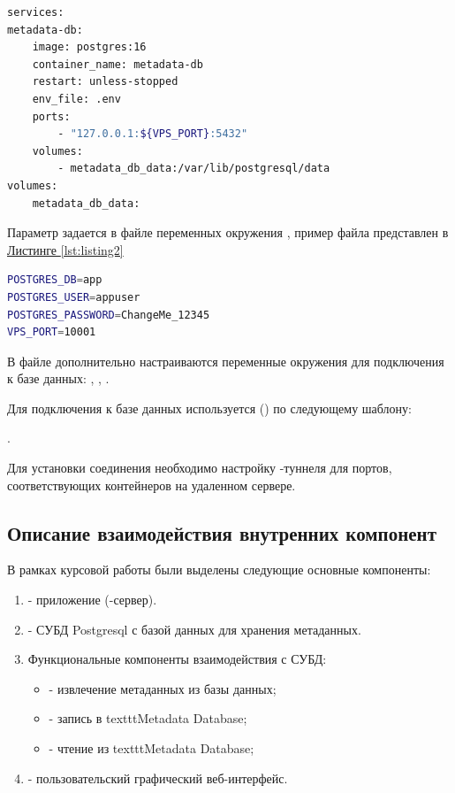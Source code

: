 \lstset{basicstyle=\ttfamily\small}
\begin{lstlisting}[language=bash, caption={docker-compose.yml файл для создания контейнера с СУБД	}, label={lst:listing1}]
services:
metadata-db:
	image: postgres:16
	container_name: metadata-db
	restart: unless-stopped
	env_file: .env
	ports:
		- "127.0.0.1:${VPS_PORT}:5432"
	volumes:
		- metadata_db_data:/var/lib/postgresql/data
volumes:
	metadata_db_data:
\end{lstlisting}

Параметр  задается в файле переменных окружения , пример файла представлен в  \hyperref[lst:listing2]{Листинге \ref*{lst:listing2}}

\begin{lstlisting}[language=bash, caption={.env файл для создания контейнера с СУБД}, label={lst:listing2}]
POSTGRES_DB=app
POSTGRES_USER=appuser
POSTGRES_PASSWORD=ChangeMe_12345
VPS_PORT=10001
\end{lstlisting}
В  файле дополнительно настраиваются переменные окружения для подключения к базе данных: , , .

Для подключения к базе данных используется  () по следующему шаблону:


.

Для установки соединения необходимо настройку -туннеля для портов, соответствующих контейнеров на удаленном сервере.

\subsection*{Описание взаимодействия внутренних компонент}
В рамках курсовой работы были выделены следующие основные компоненты:
\begin{enumerate}
	\item {} - приложение (-сервер).
	\item {} - СУБД Postgresql с базой данных для хранения метаданных.
	\item Функциональные компоненты взаимодействия с СУБД:
		\begin{itemize}
			\item {} - извлечение метаданных из базы данных;
			\item {} - запись в texttt{Metadata Database};
			\item {} - чтение из texttt{Metadata Database};
		\end{itemize}
	\item {} - пользовательский графический веб-интерфейс.
\end{enumerate}

